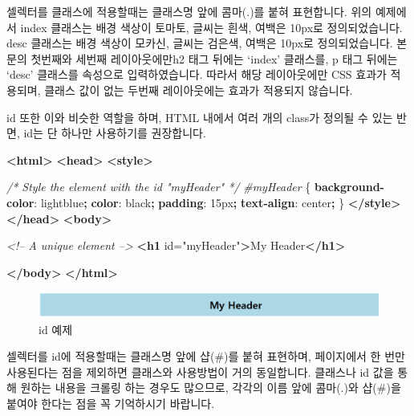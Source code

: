 \documentclass[]{book}
\newenvironment{Shaded}{\begin{snugshade}}{\end{snugshade}}
\newcommand{\CommentTok}[1]{\textcolor[rgb]{0.56,0.35,0.01}{\textit{#1}}}
\newcommand{\ConstantTok}[1]{\textcolor[rgb]{0.00,0.00,0.00}{#1}}
\newcommand{\DataTypeTok}[1]{\textcolor[rgb]{0.13,0.29,0.53}{#1}}
\newcommand{\DecValTok}[1]{\textcolor[rgb]{0.00,0.00,0.81}{#1}}
\newcommand{\KeywordTok}[1]{\textcolor[rgb]{0.13,0.29,0.53}{\textbf{#1}}}
\newcommand{\NormalTok}[1]{#1}
\newcommand{\OperatorTok}[1]{\textcolor[rgb]{0.81,0.36,0.00}{\textbf{#1}}}
\newcommand{\OtherTok}[1]{\textcolor[rgb]{0.56,0.35,0.01}{#1}}
\newcommand{\PreprocessorTok}[1]{\textcolor[rgb]{0.56,0.35,0.01}{\textit{#1}}}
\newcommand{\StringTok}[1]{\textcolor[rgb]{0.31,0.60,0.02}{#1}}
\begin{document}
셀렉터를 클래스에 적용할때는 클래스명 앞에 콤마(.)를 붙혀 표현합니다. 위의 예제에서 index 클래스는 배경 색상이 토마토, 글씨는 흰색, 여백은 10px로 정의되었습니다. desc 클래스는 배경 색상이 모카신, 글씨는 검은색, 여백은 10px로 정의되었습니다. 본문의 첫번째와 세번째 레이아웃에만h2 태그 뒤에는 `index' 클래스를, p 태그 뒤에는 `desc' 클래스를 속성으로 입력하였습니다. 따라서 해당 레이아웃에만 CSS 효과가 적용되며, 클래스 값이 없는 두번째 레이아웃에는 효과가 적용되지 않습니다.

id 또한 이와 비슷한 역할을 하며, HTML 내에서 여러 개의 class가 정의될 수 있는 반면, id는 단 하나만 사용하기를 권장합니다.

\begin{Shaded}
\begin{Highlighting}[]
\KeywordTok{<html>}
\KeywordTok{<head>}
\KeywordTok{<style>}

\CommentTok{/* Style the element with the id "myHeader" */}
\PreprocessorTok{#myHeader}\NormalTok{ \{}
  \KeywordTok{background-color}\NormalTok{: }\ConstantTok{lightblue}\OperatorTok{;}
  \KeywordTok{color}\NormalTok{: }\ConstantTok{black}\OperatorTok{;}
  \KeywordTok{padding}\NormalTok{: }\DecValTok{15}\DataTypeTok{px}\OperatorTok{;}
  \KeywordTok{text-align}\NormalTok{: }\DecValTok{center}\OperatorTok{;}
\NormalTok{\}}
\KeywordTok{</style>}
\KeywordTok{</head>}
\KeywordTok{<body>}

\CommentTok{<!-- A unique element -->}
\KeywordTok{<h1}\OtherTok{ id=}\StringTok{"myHeader"}\KeywordTok{>}\NormalTok{My Header}\KeywordTok{</h1>}

\KeywordTok{</body>}
\KeywordTok{</html>}
\end{Highlighting}
\end{Shaded}

\begin{figure}

{\centering \includegraphics[width=0.5\linewidth]{images/html_10} 

}

\caption{id 예제}\label{fig:unnamed-chunk-26}
\end{figure}

셀렉터를 id에 적용할때는 클래스명 앞에 샵(\#)를 붙혀 표현하며, 페이지에서 한 번만 사용된다는 점을 제외하면 클래스와 사용방법이 거의 동일합니다. 클래스나 id 값을 통해 원하는 내용을 크롤링 하는 경우도 많으므로, 각각의 이름 앞에 콤마(.)와 샵(\#)을 붙여야 한다는 점을 꼭 기억하시기 바랍니다.
\end{document}
